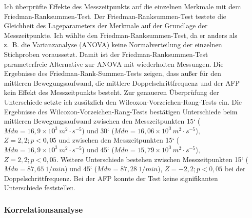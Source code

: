 Ich überprüfte Effekte des Messzeitpunkts auf die einzelnen Merkmale mit dem Friedman-Ranksummen-Test. Der Friedman-Ranksummen-Test testete die Gleichheit des Lageparameters der Merkmale auf der Grundlage der Messzeitpunkte. Ich wählte den Friedman-Ranksummen-Test, da er anders als z.~B. die Varianzanalyse (ANOVA) keine Normalverteilung der einzelnen Stichproben voraussetzt. Damit ist der Friedman-Ranksummen-Test parameterfreie Alternative zur ANOVA mit wiederholten Messungen. Die Ergebnisse des Friedman-Rank-Summen-Tests zeigen, dass außer für den mittleren Bewegungsaufwand, die mittlere Doppelschrittfrequenz und der \ac{AFP} kein Effekt des Messzeitpunkts besteht. Zur genaueren Überprüfung der Unterschiede setzte ich zusätzlich den Wilcoxon-Vorzeichen-Rang-Tests ein. Die Ergebnisse des Wilcoxon-Vorzeichen-Rang-Tests bestätigen Unterschiede beim mittleren Bewegungsaufwand zwischen den Messzeitpunkten 15‘ ($Mdn = 16{,}9 \times 10^3 \: m^2 \cdot s^{-5}$) und 30‘ ($Mdn = 16{,}06 \times 10^3 \: m^2 \cdot s^{-5}$), $Z = 2{,}2; p < 0{,}05$ und zwischen den Messzeitpunkten 15‘ ($Mdn = 16{,}9 \times 10^3 \: m^2 \cdot s^{-5}$) und 45‘ ($Mdn = 15{,}79 \times 10^3 \: m^2 \cdot s^{-5}$), $Z = 2{,}2; p < 0{,}05$. Weitere Unterschiede bestehen zwischen Messzeitpunkten 15‘ ($Mdn = 87{,}65 \: 1/min$) und 45‘ ($Mdn = 87{,}28 \: 1/min$), $Z = -2{,}2; p < 0{,}05$ bei der Doppelschrittfrequenz. Bei der \ac{AFP} konnte der Test keine signifikanten Unterschiede feststellen. 

\subsubsection{Korrelationsanalyse} 

\label{subs:korrelationsanalyse_5_1}

